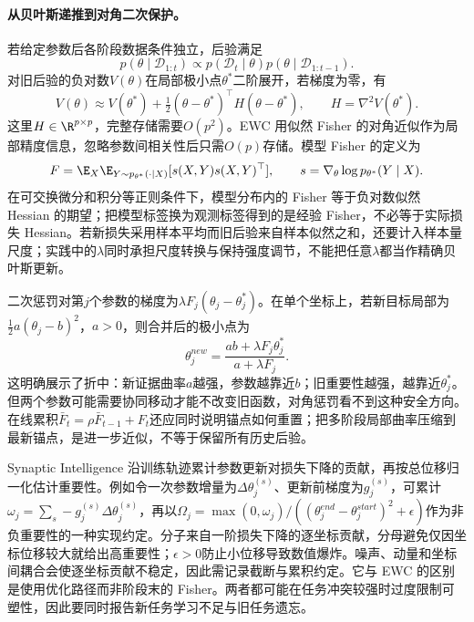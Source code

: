 \paragraph{从贝叶斯递推到对角二次保护。}
若给定参数后各阶段数据条件独立，后验满足
\begin{equation}
 p(\theta\mid\mathcal D_{1:t})\propto p(\mathcal D_t\mid\theta)
 p(\theta\mid\mathcal D_{1:t-1}).
\end{equation}
对旧后验的负对数$V(\theta)$在局部极小点$\theta^*$二阶展开，若梯度为零，有
\begin{equation}
 V(\theta)\approx V(\theta^*)+\tfrac12(\theta-\theta^*)^\top H(\theta-\theta^*),
 \qquad H=\nabla^2V(\theta^*).
\end{equation}
这里$H\in\R^{p\times p}$，完整存储需要$O(p^2)$。EWC 用似然 Fisher 的对角近似作为局部精度信息，忽略参数间相关性后只需$O(p)$存储。模型 Fisher 的定义为
\begin{equation}
 F=\E_{X}\E_{Y\sim p_{\theta^*}(\cdot\mid X)}[s(X,Y)s(X,Y)^\top],
 \qquad s=\nabla_\theta\log p_{\theta^*}(Y\mid X).
\end{equation}
在可交换微分和积分等正则条件下，模型分布内的 Fisher 等于负对数似然 Hessian 的期望；把模型标签换为观测标签得到的是经验 Fisher，不必等于实际损失 Hessian。若新损失采用样本平均而旧后验来自样本似然之和，还要计入样本量尺度；实践中的$\lambda$同时承担尺度转换与保持强度调节，不能把任意$\lambda$都当作精确贝叶斯更新。

二次惩罚对第$j$个参数的梯度为$\lambda F_j(\theta_j-\theta_j^*)$。在单个坐标上，若新目标局部为$\tfrac12a(\theta_j-b)^2$，$a>0$，则合并后的极小点为
\begin{equation}
 \theta_j^{new}=\frac{ab+\lambda F_j\theta_j^*}{a+\lambda F_j}.
\end{equation}
这明确展示了折中：新证据曲率$a$越强，参数越靠近$b$；旧重要性越强，越靠近$\theta_j^*$。但两个参数可能需要协同移动才能不改变旧函数，对角惩罚看不到这种安全方向。在线累积$\bar F_t=\rho\bar F_{t-1}+F_t$还应同时说明锚点如何重置；把多阶段局部曲率压缩到最新锚点，是进一步近似，不等于保留所有历史后验。

Synaptic Intelligence 沿训练轨迹累计参数更新对损失下降的贡献，再按总位移归一化估计重要性\cite{zenke2017si}。例如令一次参数增量为$\Delta\theta_j^{(s)}$、更新前梯度为$g_j^{(s)}$，可累计$\omega_j=\sum_s-g_j^{(s)}\Delta\theta_j^{(s)}$，再以$\Omega_j=\max(0,\omega_j)/((\theta_j^{end}-\theta_j^{start})^2+\epsilon)$作为非负重要性的一种实现约定。分子来自一阶损失下降的逐坐标贡献，分母避免仅因坐标位移较大就给出高重要性；$\epsilon>0$防止小位移导致数值爆炸。噪声、动量和坐标间耦合会使逐坐标贡献不稳定，因此需记录截断与累积约定。它与 EWC 的区别是使用优化路径而非阶段末的 Fisher。两者都可能在任务冲突较强时过度限制可塑性，因此要同时报告新任务学习不足与旧任务遗忘。

